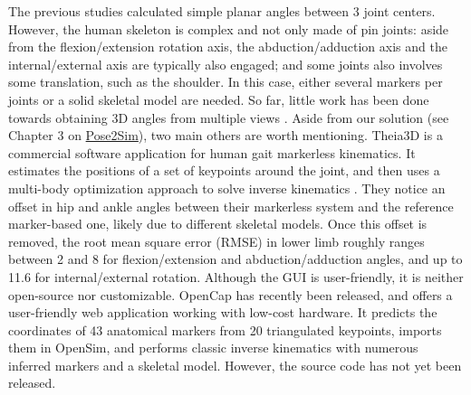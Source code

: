 The previous studies calculated simple planar angles between 3 joint centers. However, the human skeleton is complex and not only made of pin joints: aside from the flexion/extension rotation axis, the abduction/adduction axis and the internal/external axis are typically also engaged; and some joints also involves some translation, such as the shoulder. In this case, either several markers per joints or a solid skeletal model are needed. So far, little work has been done towards obtaining 3D angles from multiple views \cite{Zheng2022}. Aside from our solution (see Chapter 3 on \hyperref[ch:3]{Pose2Sim}), two main others are worth mentioning. Theia3D is a commercial software application for human gait markerless kinematics. It estimates the positions of a set of keypoints around the joint, and then uses a multi-body optimization approach to solve inverse kinematics \cite{Kanko2021a,Kanko2021b}. They notice an offset in hip and ankle angles between their markerless system and the reference marker-based one, likely due to different skeletal models. Once this offset is removed, the root mean square error (RMSE) in lower limb roughly ranges between 2 and 8\degree{} for flexion/extension and abduction/adduction angles, and up to 11.6\degree{} for internal/external rotation. Although the GUI is user-friendly, it is neither open-source nor customizable. OpenCap \cite{Uhlrich2022} has recently been released, and offers a user-friendly web application working with low-cost hardware. It predicts the coordinates of 43 anatomical markers from 20 triangulated keypoints, imports them in OpenSim, and performs classic inverse kinematics with numerous inferred markers and a skeletal model. However, the source code has not yet been released. 

